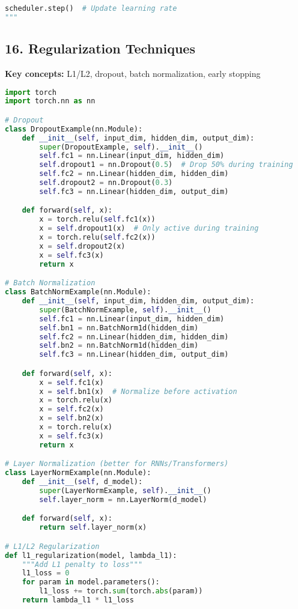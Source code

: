 \documentclass[8pt,landscape]{article}
\begin{document}
\begin{multicols}{3}
\begin{lstlisting}[language=Python]
    scheduler.step()  # Update learning rate
"""
\end{lstlisting}

\subsection*{16. Regularization Techniques}
\textbf{Key concepts:} L1/L2, dropout, batch normalization, early stopping
\begin{lstlisting}[language=Python]
import torch
import torch.nn as nn

# Dropout
class DropoutExample(nn.Module):
    def __init__(self, input_dim, hidden_dim, output_dim):
        super(DropoutExample, self).__init__()
        self.fc1 = nn.Linear(input_dim, hidden_dim)
        self.dropout1 = nn.Dropout(0.5)  # Drop 50% during training
        self.fc2 = nn.Linear(hidden_dim, hidden_dim)
        self.dropout2 = nn.Dropout(0.3)
        self.fc3 = nn.Linear(hidden_dim, output_dim)

    def forward(self, x):
        x = torch.relu(self.fc1(x))
        x = self.dropout1(x)  # Only active during training
        x = torch.relu(self.fc2(x))
        x = self.dropout2(x)
        x = self.fc3(x)
        return x

# Batch Normalization
class BatchNormExample(nn.Module):
    def __init__(self, input_dim, hidden_dim, output_dim):
        super(BatchNormExample, self).__init__()
        self.fc1 = nn.Linear(input_dim, hidden_dim)
        self.bn1 = nn.BatchNorm1d(hidden_dim)
        self.fc2 = nn.Linear(hidden_dim, hidden_dim)
        self.bn2 = nn.BatchNorm1d(hidden_dim)
        self.fc3 = nn.Linear(hidden_dim, output_dim)

    def forward(self, x):
        x = self.fc1(x)
        x = self.bn1(x)  # Normalize before activation
        x = torch.relu(x)
        x = self.fc2(x)
        x = self.bn2(x)
        x = torch.relu(x)
        x = self.fc3(x)
        return x

# Layer Normalization (better for RNNs/Transformers)
class LayerNormExample(nn.Module):
    def __init__(self, d_model):
        super(LayerNormExample, self).__init__()
        self.layer_norm = nn.LayerNorm(d_model)

    def forward(self, x):
        return self.layer_norm(x)

# L1/L2 Regularization
def l1_regularization(model, lambda_l1):
    """Add L1 penalty to loss"""
    l1_loss = 0
    for param in model.parameters():
        l1_loss += torch.sum(torch.abs(param))
    return lambda_l1 * l1_loss


\end{lstlisting}
\end{multicols}
\end{document}
